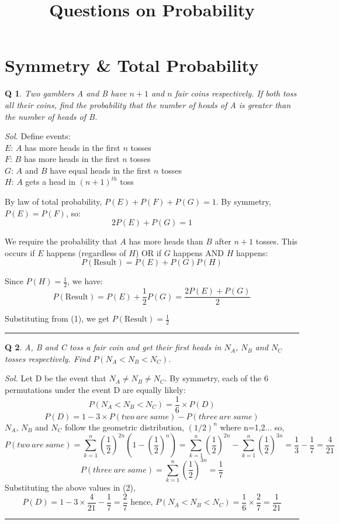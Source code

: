 \documentclass[DIV=15, fleqn, oneside, 8pt]{scrartcl}
\title{Questions on Probability}
\date{}                    %
\theoremstyle{clean}
\newtheorem{question}{Q} %
\newenvironment{solution}
{\par\textit{Sol.} }     %
{\par\medskip\hrule\bigskip}
\begin{document}
\maketitle

\newpage
\section*{Symmetry \& Total Probability}
\begin{question}
Two gamblers A and B have $n+1$ and $n$ fair coins respectively. If both toss
all their coins, find the probability that the number of heads of A is greater than the
number of heads of B.
\end{question}
\begin{solution}
Define events: \\
$E$: $A$ has more heads in the first $n$ tosses \\
$F$: $B$ has more heads in the first $n$ tosses \\
$G$: $A$ and $B$ have equal heads in the first $n$ tosses \\
$H$: $A$ gets a head in $(n+1)^{th}$ toss

By law of total probability, $P(E) + P(F) + P(G) = 1$. By symmetry, $P(E) = P(F)$, so:
\begin{equation}
2P(E) + P(G) = 1
\end{equation}

We require the probability that $A$ has more heads than $B$ after $n+1$ tosses. This occurs if $E$ happens (regardless of $H$) OR if $G$ happens AND $H$ happens:
\[ P(\text{Result}) = P(E) + P(G)P(H) \]

Since $P(H) = \frac{1}{2}$, we have:
\[ P(\text{Result}) = P(E) + \frac{1}{2}P(G) = \frac{2P(E) + P(G)}{2} \]

Substituting from (1), we get $P(\text{Result}) = \frac{1}{2}$
\end{solution}


\begin{question}
A, B and C toss a fair coin and get their first heads in $N_A$, $N_B$ and $N_C$ tosses
respectively.
Find $P(N_A < N_B < N_C)$.
\end{question}
\begin{solution}
Let D be the event that $N_A \neq N_B \neq N_C$. By symmetry, each of the 6 permutations under the
event D are equally likely:
\[P(N_A < N_B < N_C) = \frac{1}{6} \times P(D)\]
\begin{equation}
  P(D) = 1 - 3 \times P(two\:are\:same) - P(three\:are\:same)
\end{equation}
$N_A$, $N_B$ and $N_C$ follow the geometric distribution, $(1/2)^n$ where n=1,2... so,
\[P(two\:are\:same) = \sum_{k = 1}^{n}{(\frac{1}{2})^{2n}(1 - (\frac{1}{2})^n)} = 
\sum_{k = 1}^{n}{(\frac{1}{2})^{2n}} - \sum_{k = 1}^{n}{(\frac{1}{2})^{3n}}
= \frac{1}{3} - \frac{1}{7} = \frac{4}{21}\]\[
P(three\:are\:same) = \sum_{k = 1}^{n}{(\frac{1}{2})^{3n}} = \frac{1}{7}\]
Substituting the above values in (2),
\[
P(D) = 1 - 3 \times \frac{4}{21} - \frac{1}{7} = \frac{2}{7} \text{ hence, }
P(N_A < N_B < N_C) = \frac{1}{6} \times \frac{2}{7} = \frac{1}{21}
\]
\end{solution}
\end{document}
